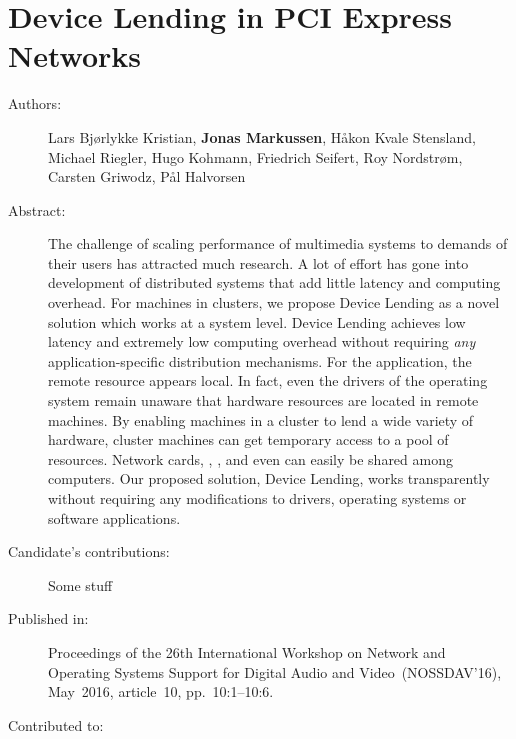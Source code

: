 \chapter{Device Lending in PCI Express Networks}
\label{paper:NOSSDAV-2016}
\paperthumb

\begin{description}
	\item[Authors:]
		Lars Bj{\o}rlykke Kristian, \textbf{Jonas Markussen}, H{\aa}kon Kvale Stensland,
		Michael Riegler, Hugo Kohmann, Friedrich Seifert, Roy Nordstr{\o}m, Carsten Griwodz, P{\aa}l Halvorsen

	\item[Abstract:]
		The challenge of scaling  performance of multimedia systems to demands
		of their users has attracted much research.
		A lot of effort has gone into
		development of distributed systems that add little latency and computing overhead.
		For machines in  clusters,
		we propose Device Lending as a novel solution which works at a system
		level.
		Device Lending achieves low latency and extremely low computing overhead without
		requiring \textit{any} application-specific distribution mechanisms.
		For the application, the remote  resource appears local.
		In fact, even the drivers of the operating system remain unaware that
		hardware resources are located in remote machines.
		By enabling machines in a  cluster to lend a wide variety of hardware, 
		cluster machines can get temporary access to a pool of  resources. 
		Network cards, , , and even  can easily 
		be shared among computers.
		Our proposed solution, Device Lending, works transparently without requiring any modifications to drivers,
		operating systems or software applications.

	\item[Candidate's contributions:]
		Some stuff

	\item[Published in:]
		Proceedings of the 26th International Workshop on Network and Operating Systems Support for Digital Audio and Video~(NOSSDAV'16),
		May~2016, article~10, pp.~10:1--10:6.

	\item[Contributed to:]

\end{description}

